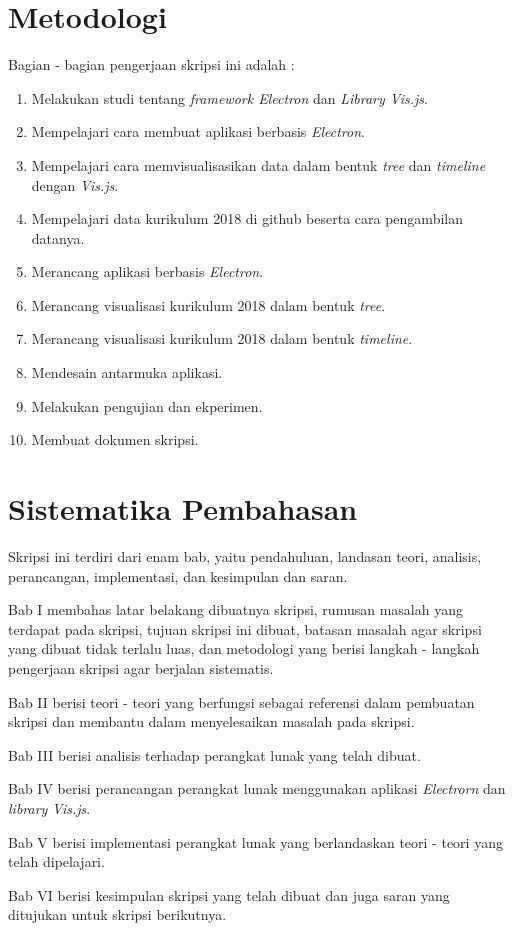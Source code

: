 \section{Metodologi}
\label{sec:metlit}
Bagian - bagian pengerjaan skripsi ini adalah :
\begin{enumerate}
    \item Melakukan studi tentang \textit{framework Electron} dan \textit{Library Vis.js}.
    \item Mempelajari cara membuat aplikasi berbasis \textit{Electron}.
    \item Mempelajari cara memvisualisasikan data dalam bentuk \textit{tree} dan \textit{timeline} dengan \textit{Vis.js}.
    \item Mempelajari data kurikulum 2018 di github beserta cara pengambilan datanya.
    \item Merancang aplikasi berbasis \textit{Electron}.
    \item Merancang visualisasi kurikulum 2018 dalam bentuk \textit{tree}.
    \item Merancang visualisasi kurikulum 2018 dalam bentuk \textit{timeline}.
    \item Mendesain antarmuka aplikasi.
    \item Melakukan pengujian dan ekperimen.
    \item Membuat dokumen skripsi.
\end{enumerate}



\section{Sistematika Pembahasan}
\label{sec:sispem}
Skripsi ini terdiri dari enam bab, yaitu pendahuluan, landasan teori, analisis, perancangan, implementasi, dan kesimpulan dan saran. 

Bab I membahas latar belakang dibuatnya skripsi, rumusan masalah yang terdapat pada skripsi, tujuan skripsi ini dibuat, batasan masalah agar skripsi yang dibuat tidak terlalu luas, dan metodologi yang berisi langkah - langkah pengerjaan skripsi agar berjalan sistematis.

Bab II berisi teori - teori yang berfungsi sebagai referensi dalam pembuatan skripsi dan membantu dalam menyelesaikan masalah pada skripsi.

Bab III berisi analisis terhadap perangkat lunak yang telah dibuat.

Bab IV berisi perancangan perangkat lunak menggunakan aplikasi \textit{Electrorn} dan \textit{library} \textit{Vis.js}.

Bab V berisi implementasi perangkat lunak yang berlandaskan teori - teori yang telah dipelajari.

Bab VI berisi kesimpulan skripsi yang telah dibuat dan juga saran yang ditujukan untuk skripsi berikutnya.

